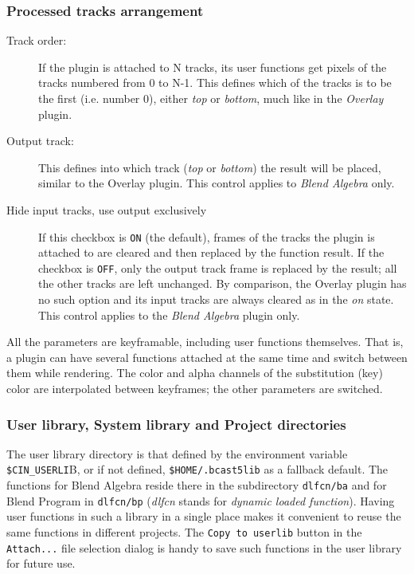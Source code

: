 \subsubsection*{Processed tracks arrangement}
\label{ssub:processed_tracks}

\begin{description}
	\item[Track order:] If the plugin is attached to N tracks, its user functions get pixels of the tracks numbered from 0 to N-1. This defines which of the tracks is to be the first (i.e. number 0), either \textit{top} or \textit{bottom}, much like in the \textit{Overlay} plugin.
	\item[Output track:] This defines into which track (\textit{top} or \textit{bottom}) the result will be placed, similar to the Overlay plugin. This control applies to \textit{Blend Algebra} only.
	\item[Hide input tracks, use output exclusively] If this checkbox is \texttt{ON} (the default), frames of the tracks the plugin is attached to are cleared and then replaced by the function result. If the checkbox is \texttt{OFF}, only the output track frame is replaced by the result; all the other tracks are left unchanged. By comparison, the Overlay plugin has no such option and its input tracks are always cleared as in the \textit{on} state. This control applies to the  \textit{Blend Algebra} plugin only.
\end{description}

All the parameters are keyframable, including user functions themselves. That is, a plugin can have several functions attached at the same time and switch between them while rendering. The color and alpha channels of the substitution (key) color are interpolated between keyframes; the other parameters are switched.

\subsubsection*{User library, System library and Project directories}
\label{ssub:user_library}

The user library directory is that defined by the environment variable \texttt{\$CIN\_USERLI}B, or if not defined, \texttt{\$HOME/.bcast5lib} as a fallback default. The functions for Blend Algebra reside there in the subdirectory \texttt{dlfcn/ba} and for Blend Program in \texttt{dlfcn/bp} (\textit{dlfcn} stands for \textit{dynamic loaded function}). Having user functions in such a library in a single place makes it convenient to reuse the same functions in different projects. The \texttt{Copy to userlib} button in the \texttt{Attach...} file selection dialog is handy to save such functions in the user library for future use.

